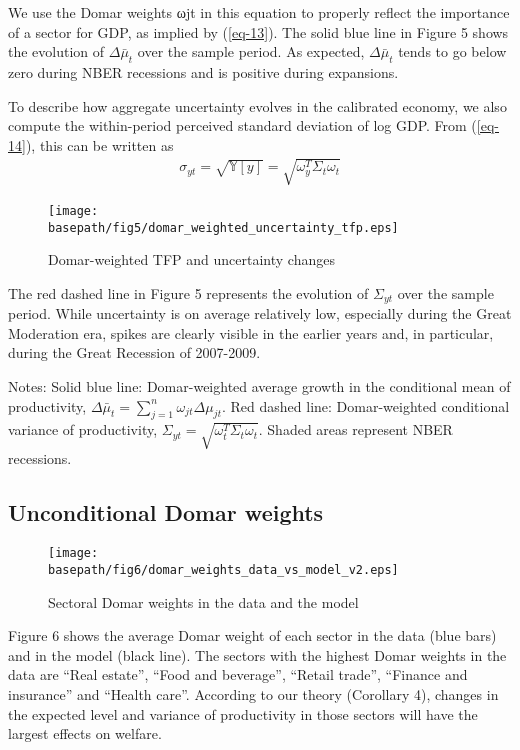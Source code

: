 \documentclass[11pt]{article}
\theoremstyle{definition}
\newcommand{\basepath}{F:/12004835/replication_package_final/replication_package_final/output_figures}
\begin{document}
	We use the Domar weights ωjt in this equation to properly reflect the importance of a sector for GDP, as implied by (\ref{eq-13}). The solid blue line in Figure 5 shows the evolution of $\Delta\bar{\mu}_t$ over the sample period. As expected, $\Delta\bar{\mu}_t$ tends to go below zero during NBER recessions and is positive during expansions.
	
	To describe how aggregate uncertainty evolves in the calibrated economy, we also compute the within-period perceived standard deviation of log GDP. From (\ref{eq-14}), this can be written as
	\begin{align}
		\sigma_{yt} = \sqrt{\mathbb{Y}[y]} = \sqrt{\omega_y^T \Sigma_t \omega_t} \label{eq-71}
	\end{align}
	
	\begin{figure}[ht]
		\caption{Domar-weighted TFP and uncertainty changes}
		\texttt{[image: \\basepath/fig5/domar\_weighted\_uncertainty\_tfp.eps]}
		\label{fig:5}
	\end{figure}
	
	The red dashed line in Figure 5 represents the evolution of $\Sigma_{yt}$ over the sample period. While uncertainty is on average relatively low, especially during the Great Moderation era, spikes are clearly visible in the earlier years and, in particular, during the Great Recession of 2007-2009.
	
	Notes: Solid blue line: Domar-weighted average growth in the conditional mean of productivity, $\Delta\bar{\mu}_t = \sum\limits_{j=1}^n \omega_{jt}\Delta\mu_{jt}$. Red dashed line: Domar-weighted conditional variance of productivity, $\Sigma_{yt} = \sqrt{\omega_t^T \Sigma_t \omega_t}$. Shaded areas represent NBER recessions.
	
	\subsection*{Unconditional Domar weights}
	
	\begin{figure}[ht]
		\centering
		\caption{Sectoral Domar weights in the data and the model}
		\texttt{[image: \\basepath/fig6/domar\_weights\_data\_vs\_model\_v2.eps]}
		\label{fig:6}
	\end{figure}
	
	Figure 6 shows the average Domar weight of each sector in the data (blue bars) and in the model (black line). The sectors with the highest Domar weights in the data are ``Real estate'', ``Food and beverage'', ``Retail trade'', ``Finance and insurance'' and ``Health care''. According to our theory (Corollary 4), changes in the expected level and variance of productivity in those sectors will have the largest effects on welfare.
	
\end{document}
